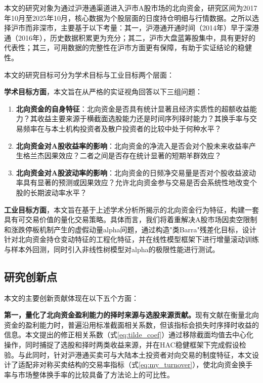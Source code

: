 \documentclass{article}
\begin{document}
本文的研究对象为通过沪港通渠道进入沪市A股市场的北向资金，研究区间为2017年10月至2025年10月，核心数据为个股层面的日度持仓明细与行情数据。之所以选择沪市而非深市，主要基于以下考量：其一，沪港通开通时间（2014年）早于深港通（2016年），历史数据积累更为充分；其二，沪市大盘蓝筹股集中，具有更好的代表性；其三，可用数据的完整性在沪市方面更有保障，有助于实证结论的稳健性。

本文的研究目标可分为学术目标与工业目标两个层面：

\textbf{学术目标方面}，本文旨在从严格的实证视角回答以下三组问题：
\begin{enumerate}
    \item \textbf{北向资金的自身特征}：北向资金是否具有统计显著且经济实质性的超额收益能力？其收益主要来源于横截面选股能力还是时间序列择时能力？其换手率与交易频率在与本土机构投资者及散户投资者的比较中处于何种水平？
    \item \textbf{北向资金对A股收益率的影响}：北向资金的净流入是否会对个股未来收益率产生格兰杰因果效应？二者之间是否存在统计显著的短期羊群效应？
    \item \textbf{北向资金对A股波动率的影响}：北向资金的日频净交易量是否对个股收益波动率具有显著的预测或因果效应？允许北向资金参与交易是否会系统性地改变个股的长期波动率水平？
\end{enumerate}

\textbf{工业目标方面}，本文旨在基于上述学术分析所揭示的北向资金行为特征，构建一套具有可交易价值的量化交易策略。具体而言，我们将着重解决A股市场因卖空限制和涨跌停板机制产生的虚假动量alpha问题，通过构造"类Barra"残差化目标，设计针对北向资金持仓变动特征的工程化特征，并在线性模型框架下进行增量滚动训练与样本外回测，同时引入非线性树模型对alpha的极限性能进行测试。

\subsection{研究创新点}

本文的主要创新贡献体现在以下五个方面：

\textbf{第一，量化了北向资金盈利能力的择时来源与选股来源贡献。}现有文献在衡量北向资金的盈利能力时，普遍沿用标准截面相关系数，但该指标会损失时序择时收益的信息。本文提出的修正相关系数（式\ref{eq:tilde_coef}）通过移除截面均值去中心化操作，同时捕捉了选股和择时两类收益来源，并在HAC稳健框架下完成假设检验。与此同时，针对沪港通买卖可与大陆本土投资者对向交易的制度特征，本文设计了适配非对称买卖结构的交易率指标（式\ref{eq:my_turnover}），使北向资金换手率与市场整体换手率的比较具备了方法论上的可比性。
\end{document}

